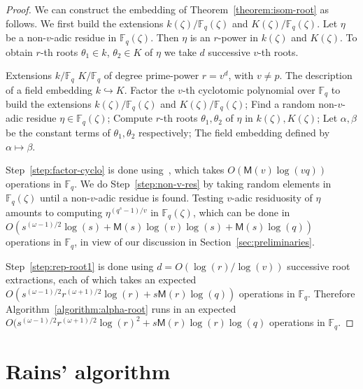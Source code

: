 \documentclass[12pt]{article}
\theoremstyle{plain}
\theoremstyle{definition}
\def\F{\ensuremath{\mathbb{F}}}
\def\MM{\ensuremath{\mathsf{M}}}
\newcounter{algorithm}
\begin{document}
\begin{proof}
We can construct the embedding of Theorem~\ref{theorem:isom-root} as
follows. We first build the extensions $k(\zeta) / \F_q(\zeta)$ and
$K(\zeta)/\F_q(\zeta)$. Let $\eta$ be a non-$v$-adic residue in
$\F_q(\zeta)$.  Then $\eta$ is an $r$-power in $k(\zeta)$ and
$K(\zeta)$. To obtain $r$-th roots $\theta_1\in k$, $\theta_2\in K$ of
$\eta$ we take $d$ successive $v$-th roots.

\begin{algorithm}
	\label{algorithm:alpha-root}
	\begin{algorithmic}[1]
		\REQUIRE Extensions $k / \F_q$ $K/\F_q$ of degree prime-power $r = v^d$, with $v\ne p$.
		\ENSURE The description of a field embedding $k\hookrightarrow K$.
		\STATE\label{step:factor-cyclo} Factor the $v$-th cyclotomic polynomial over $\F_q$ to 
		build the extensions $k(\zeta) / \F_q(\zeta)$ and $K(\zeta)/\F_q(\zeta)$;
		\STATE\label{step:non-v-res} Find a random non-$v$-adic residue $\eta \in \F_q(\zeta)$;
		\STATE\label{step:rep-root1} Compute $r$-th roots $\theta_1,\theta_2$ of $\eta$ in $k(\zeta),K(\zeta)$;
		\STATE Let $\alpha, \beta$ be the constant terms of $\theta_1, \theta_2$ respectively;
		\RETURN The field embedding defined by $\alpha\mapsto\beta$.
	\end{algorithmic}
\end{algorithm}

Step~\ref{step:factor-cyclo} is done using~\cite[Theorem~9]{shoup94},
which takes $O(\MM(v)\log(vq))$ operations in $\F_q$. We do
Step~\ref{step:non-v-res} by taking random elements in $\F_q(\zeta)$
until a non-$v$-adic residue is found. Testing $v$-adic residuosity of
$\eta$ amounts to computing $\eta^{(q^s-1)/v}$ in $\F_q(\zeta)$, which
can be done in $O(s^{(\omega-1)/2}\log(s) + \MM(s)\log(v)\log(s) +
\MM(s)\log(q))$ operations in $\F_q$, in view of our discussion in
Section~\ref{sec:preliminaries}.

Step~\ref{step:rep-root1} is done using $d = O(\log(r) / \log(v))$
successive root extractions, each of which takes an expected
$O(s^{(\omega-1)/2}r^{(\omega+1)/2}\log(r) + s\MM(r)\log(q))$
operations in $\F_q$. Therefore Algorithm~\ref{algorithm:alpha-root}
runs in an expected $O(s^{(\omega-1)/2}r^{(\omega+1)/2}\log(r)^2 + s\MM(r)\log(r)\log(q)$ operations in
$\F_q$.
\end{proof}




\section{Rains' algorithm}
\label{sec:rains-algorithm}
\end{document}
